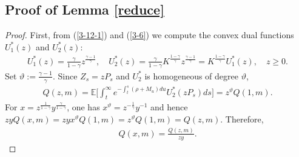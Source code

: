 \documentclass[a4paper,11pt]{amsart}
\numberwithin{equation}{section}
\begin{document}
{\subsection{Proof of Lemma \ref{reduce}}\label{proreduce}
\begin{proof}
	First, from (\ref{3-12-1}) and (\ref{3-6}) we compute the convex dual functions $U_1^\ast(z)$ and $U^\ast_2(z)$:
\begin{align}\label{4-2-1}
U^\ast_1(z)= \frac{\gamma}{1-\gamma}z^{\frac{\gamma-1}{\gamma}}, \quad U^\ast_2(z)= \frac{\gamma}{1-\gamma}K^{\frac{1-\gamma}{\gamma}}z^{\frac{\gamma-1}{\gamma}}=K^{\frac{1-\gamma}{\gamma}}U^\ast_1(z), \quad z\geq 0. 
\end{align}
{Set $\vartheta:=\frac{\gamma-1}{\gamma}$. Since $Z_s=zP_s$ and $U_2^\ast$ is homogeneous of degree $\vartheta$,}
\begin{align*}
{Q(z,m)=\mathbb E\bigg[\int_t^\infty e^{-\int_t^s(\rho+M_u)du}U_2^\ast(zP_s)ds\bigg]=z^\vartheta Q(1,m).}
\end{align*}
{For $x=z^{\frac{1}{1-\gamma}}y^{\frac{\gamma}{1-\gamma}}$, one has $x^\vartheta=z^{-\frac{1}{\gamma}}y^{-1}$ and hence $zyQ(x,m)=zyx^\vartheta Q(1,m)=z^\vartheta Q(1,m)=Q(z,m)$. Therefore,}
\begin{align}\label{4-4-1}
{Q(x,m)=\frac{Q(z,m)}{zy}.}
\end{align} 



\end{proof}}
\end{document}
